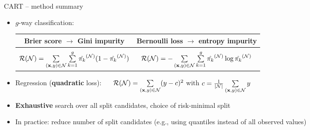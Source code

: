 \begin{frame}{CART -- method summary}
\begin{itemize}
\begin{itemize}
      \item $g$-way classification:
      \begin{tabular}{c |@{\vline}| c} 
 \textbf{Brier score} $\rightarrow$ \textbf{Gini} impurity & \textbf{Bernoulli} loss $\rightarrow$ \textbf{entropy} impurity \\ 
 \hline\\[-2ex]
 $\mathcal{R}(\mathcal{N}) = \sum\limits_{(\mathbf{x},y) \in \mathcal{N}} \sum\limits_{k=1}^g
      \hat{\pi_{k}}^{(\mathcal{N})} (1 - \hat{\pi_{k}}^{(\mathcal{N})} )$ & $\mathcal{R}(\mathcal{N}) = -\sum\limits_{(\mathbf{x},y) \in \mathcal{N}} \sum\limits_{k=1}^g
      \hat{\pi_{k}}^{(\mathcal{N})} \log \hat{\pi_{k}}^{(\mathcal{N})}$
\end{tabular}
      
    \item Regression (\textbf{quadratic} loss): ~~
    $\mathcal{R}(\mathcal{N}) = \sum\limits_{(\mathbf{x},y) \in \mathcal{N}} (y - c)^2$ with $c = \frac{1}{|\mathcal{N}|} \sum\limits_{(\mathbf{x},y) \in \mathcal{N}} y$
  \end{itemize}
\end{itemize}



\begin{itemize}
  \item \textbf{Exhaustive} search over all split candidates, choice of 
  risk-minimal split
  \item In practice: reduce number of split candidates (e.g., using quantiles instead of all observed values)
\end{itemize}

\medskip


\end{frame}


